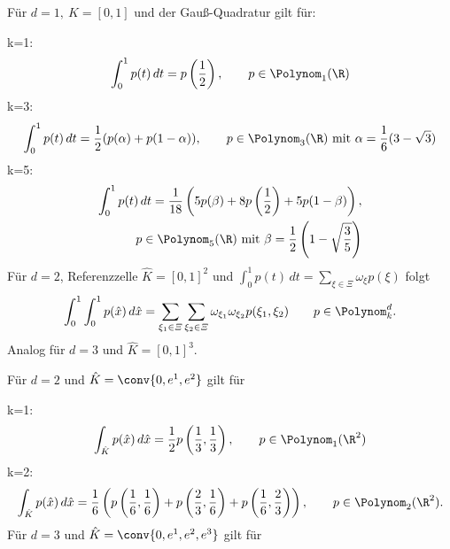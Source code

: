\begin{Beispiel}
    Für $d = 1, \ \hat K = [0, 1]$ und der Gau\ss{}-Quadratur gilt für:

    k=1:
    \begin{eqnarray*}
          \int_0^1 p(t) \,dt
        = p\left(\frac{1}{2}\right),
        \qquad p\in \Polynom_1(\R)
    \end{eqnarray*}
    k=3:
    \begin{eqnarray*}
          \int_0^1 p(t) \,dt
        = \frac{1}{2} (p(\alpha) + p(1 - \alpha)),
        \qquad p\in \Polynom_3(\R)
        \text{ mit } \alpha = \frac{1}{6} (3 - \sqrt{3})
    \end{eqnarray*}
    k=5:
    \begin{eqnarray*}
          \int_0^1 p(t) \,dt
        = \frac{1}{18} \left(5 p(\beta) + 8 p\left(\frac{1}{2}\right)
          + 5 p( 1 - \beta)\right), \\
        \qquad p\in \Polynom_5(\R)
        \text{ mit } \beta = \frac{1}{2} \left(1 - \sqrt{\frac{3}{5}}\right)
    \end{eqnarray*}
    Für $d = 2$, Referenzzelle $\hat K = [0, 1]^2$ und
    $\int_0^1 p(t) \,dt = \sum_{\xi\in \varXi} \omega_\xi p(\xi)$
    folgt
    \begin{eqnarray*}
          \int_0^1 \int_0^1 p(\hat x) \,d \hat x
        = \sum_{\xi_1\in \varXi} \sum_{\xi_2\in \varXi} \omega_{\xi_1}
          \omega_{\xi_2} p(\xi_1, \xi_2)
        \qquad p\in \Polynom_k^d.
    \end{eqnarray*}
    Analog für $d = 3$ und $\hat K = [0, 1]^3$.
    
    Für $d = 2$ und $\hat K = \conv\{0, e^1, e^2\}$ gilt für

    k=1:
    \begin{eqnarray*}
            \int_{\hat K} p(\hat x) \,d\hat x
          = \frac{1}{2} p\left(\frac{1}{3}, \frac{1}{3}\right),
          \qquad p\in \Polynom_1(\R^2)
    \end{eqnarray*}
    k=2:
    \begin{eqnarray*}
            \int_{\hat K} p(\hat x) \,d\hat x
          = \frac{1}{6} \left(p\left(\frac{1}{6}, \frac{1}{6}\right) +
            p\left(\frac{2}{3}, \frac{1}{6}\right) +
            p\left(\frac{1}{6}, \frac{2}{3}\right)\right),
          \qquad p\in \Polynom_2(\R^2).
    \end{eqnarray*}
    Für $d = 3$ und $\hat K = \conv\{0, e^1, e^2, e^3\}$ gilt für


\end{Beispiel}
